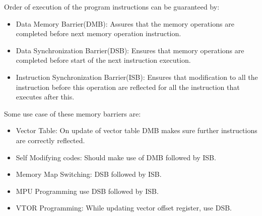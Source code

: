 Order of execution of the program instructions can be guaranteed by:
\begin{itemize}
	\item Data Memory Barrier(DMB): Assures that the memory operations are completed before next memory operation instruction.
	\item Data Synchronization Barrier(DSB): Ensures that memory operations are completed before start of the next instruction execution.
	\item Instruction Synchronization Barrier(ISB): Ensures that modification to all the instruction before this operation are reflected for all the instruction that executes after this. 
\end{itemize}
Some use case of these memory barriers are:
\begin{itemize}
	\item Vector Table: On update of vector table DMB makes sure further instructions are correctly reflected.
	\item Self Modifying codes: Should make use of DMB followed by ISB.
	\item Memory Map Switching: DSB followed by ISB.
	\item MPU Programming use DSB followed by ISB.
	\item VTOR Programming: While updating vector offset register, use DSB.
\end{itemize}


